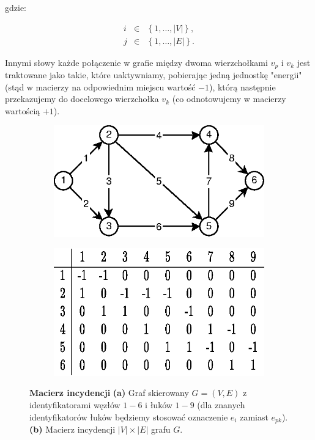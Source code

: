gdzie:

\begin{equation}
	\begin{array}{lll}
	i & \in & \left\{ 1, \ldots, \left| V \right| \right\} \textrm{,} \\
	j & \in & \left\{ 1, \ldots, \left| E \right| \right\} \textrm{.}
	\end{array}
\end{equation}

Innymi słowy każde połączenie w grafie między dwoma wierzchołkami $v_{p}$ i $v_{k}$ jest traktowane jako takie, które uaktywniamy, pobierając jedną jednostkę "energii" (stąd w macierzy na odpowiednim miejscu wartość $-1$), którą następnie przekazujemy do docelowego wierzchołka $v_{k}$ (co odnotowujemy w macierzy wartością $+1$).

\begin{figure}[!htbp]
	\centering
	\begin{subfigure}[b]{0.45\textwidth}
		\includegraphics[width=\textwidth]{Chapter_I/1/1_1a.eps}
		\caption{}
	\end{subfigure}%
	\qquad
	\begin{subfigure}[b]{0.45\textwidth}
		\includegraphics[width=\textwidth]{Chapter_I/1/1_1b.eps}
		\caption{}
	\end{subfigure}
	\caption{\textbf{Macierz incydencji} \textbf{(a)} Graf skierowany $G = \left( V, E \right)$ z identyfikatorami węzłów $1-6$ i łuków $1-9$ (dla znanych identyfikatorów łuków będziemy stosować oznaczenie $e_{i}$ zamiast $e_{pk}$). \textbf{(b)} Macierz incydencji $ \left| V \right| \times \left| E \right| $ grafu $G$.}\label{fig:incidenceMatrix}
\end{figure}

